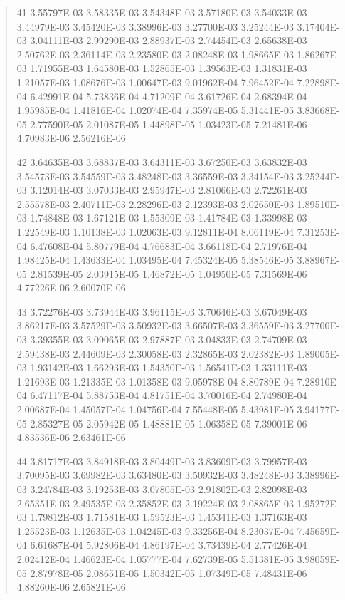 \documentclass[letterpaper,10pt,english]{sphinxmanual}
\begin{document}
\begin{quote}
\begin{DUlineblock}{0em}
\item[] 41   3.55797E-03  3.58335E-03  3.54348E-03  3.57180E-03  3.54033E-03  3.44979E-03  3.45420E-03  3.38996E-03  3.27700E-03  3.25244E-03  3.17404E-03  3.04111E-03  2.99290E-03  2.88937E-03  2.74454E-03  2.65638E-03  2.50762E-03  2.36114E-03  2.23580E-03  2.08248E-03  1.98665E-03  1.86267E-03  1.71955E-03  1.64580E-03  1.52865E-03  1.39563E-03  1.31831E-03  1.21057E-03  1.08676E-03  1.00647E-03  9.01962E-04  7.96452E-04  7.22898E-04  6.42991E-04  5.73836E-04  4.71209E-04  3.61726E-04  2.68394E-04  1.95985E-04  1.41816E-04  1.02074E-04  7.35974E-05  5.31441E-05  3.83668E-05  2.77590E-05  2.01087E-05  1.44898E-05  1.03423E-05  7.21481E-06  4.70983E-06  2.56216E-06
\item[] 42   3.64635E-03  3.68837E-03  3.64311E-03  3.67250E-03  3.63832E-03  3.54573E-03  3.54559E-03  3.48248E-03  3.36559E-03  3.34154E-03  3.25244E-03  3.12014E-03  3.07033E-03  2.95947E-03  2.81066E-03  2.72261E-03  2.55578E-03  2.40711E-03  2.28296E-03  2.12393E-03  2.02650E-03  1.89510E-03  1.74848E-03  1.67121E-03  1.55309E-03  1.41784E-03  1.33998E-03  1.22549E-03  1.10138E-03  1.02063E-03  9.12811E-04  8.06119E-04  7.31253E-04  6.47608E-04  5.80779E-04  4.76683E-04  3.66118E-04  2.71976E-04  1.98425E-04  1.43633E-04  1.03495E-04  7.45324E-05  5.38546E-05  3.88967E-05  2.81539E-05  2.03915E-05  1.46872E-05  1.04950E-05  7.31569E-06  4.77226E-06  2.60070E-06
\item[] 43   3.72276E-03  3.73944E-03  3.96115E-03  3.70646E-03  3.67049E-03  3.86217E-03  3.57529E-03  3.50932E-03  3.66507E-03  3.36559E-03  3.27700E-03  3.39355E-03  3.09065E-03  2.97887E-03  3.04833E-03  2.74709E-03  2.59438E-03  2.44609E-03  2.30058E-03  2.32865E-03  2.02382E-03  1.89005E-03  1.93142E-03  1.66293E-03  1.54350E-03  1.56541E-03  1.33111E-03  1.21693E-03  1.21335E-03  1.01358E-03  9.05978E-04  8.80789E-04  7.28910E-04  6.47117E-04  5.88753E-04  4.81751E-04  3.70016E-04  2.74980E-04  2.00687E-04  1.45057E-04  1.04756E-04  7.55448E-05  5.43981E-05  3.94177E-05  2.85327E-05  2.05942E-05  1.48881E-05  1.06358E-05  7.39001E-06  4.83536E-06  2.63461E-06
\item[] 44   3.81717E-03  3.84918E-03  3.80449E-03  3.83609E-03  3.79957E-03  3.70095E-03  3.69982E-03  3.63480E-03  3.50932E-03  3.48248E-03  3.38996E-03  3.24784E-03  3.19253E-03  3.07805E-03  2.91802E-03  2.82098E-03  2.65351E-03  2.49535E-03  2.35852E-03  2.19224E-03  2.08865E-03  1.95272E-03  1.79812E-03  1.71581E-03  1.59523E-03  1.45341E-03  1.37163E-03  1.25523E-03  1.12635E-03  1.04245E-03  9.33256E-04  8.23037E-04  7.45659E-04  6.61687E-04  5.92806E-04  4.86197E-04  3.73439E-04  2.77426E-04  2.02412E-04  1.46623E-04  1.05777E-04  7.62739E-05  5.51381E-05  3.98059E-05  2.87978E-05  2.08651E-05  1.50342E-05  1.07349E-05  7.48431E-06  4.88260E-06  2.65821E-06

\end{DUlineblock}
\end{quote}
\end{document}
